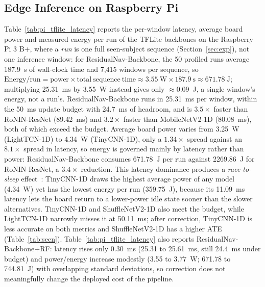 \documentclass[10pt,conference,letterpaper]{IEEEtran}
\begin{document}
\subsection{Edge Inference on Raspberry Pi}


Table~\ref{tab:pi_tflite_latency} reports the per-window latency, average board power and measured energy per run of the TFLite backbones on the Raspberry Pi 3 B+, where a \emph{run} is one full seen-subject sequence (Section~\ref{sec:exp}), not one inference window: for ResidualNav-Backbone, the 50 profiled runs average 187.9~s of wall-clock time and 7,415 windows per sequence, so $\mathrm{Energy/run} = \mathrm{power} \times \mathrm{total\ sequence\ time} \approx 3.55~\mathrm{W} \times 187.9~\mathrm{s} \approx 671.78~\mathrm{J}$; multiplying 25.31~ms by 3.55~W instead gives only $\approx$0.09~J, a single window's energy, not a run's. ResidualNav-Backbone runs in 25.31~ms per window, within the 50~ms update budget with 24.7~ms of headroom, and is $3.5\times$ faster than RoNIN-ResNet (89.42~ms) and $3.2\times$ faster than MobileNetV2-1D (80.08~ms), both of which exceed the budget. Average board power varies from 3.25~W (LightTCN-1D) to 4.34~W (TinyCNN-1D), only a $1.34\times$ spread against an $8.1\times$ spread in latency, so energy is governed mainly by latency rather than power: ResidualNav-Backbone consumes 671.78~J per run against 2269.86~J for RoNIN-ResNet, a $3.4\times$ reduction. This latency dominance produces a \emph{race-to-sleep} effect~\cite{albers2010energy}: TinyCNN-1D draws the highest average power of any model (4.34~W) yet has the lowest energy per run (359.75~J), because its 11.09~ms latency lets the board return to a lower-power idle state sooner than the slower alternatives. TinyCNN-1D and ShuffleNetV2-1D also meet the budget, while LightTCN-1D narrowly misses it at 50.11~ms; after correction, TinyCNN-1D is less accurate on both metrics and ShuffleNetV2-1D has a higher ATE (Table~\ref{tab:seen}). Table~\ref{tab:pi_tflite_latency} also reports ResidualNav-Backbone+RF: latency rises only 0.30~ms (25.31 to 25.61~ms, still 24.4~ms under budget) and power/energy increase modestly (3.55 to 3.77~W; 671.78 to 744.81~J) with overlapping standard deviations, so correction does not meaningfully change the deployed cost of the pipeline.
\end{document}
